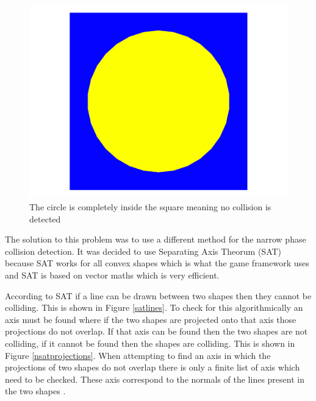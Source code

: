 \documentclass[]{report}
\begin{document}
			\begin{figure}[H]
				\centering
				\includegraphics[scale=0.25]{lineintersectionproblem}
				\caption{The circle is completely inside the square meaning no collision is detected}
				\label{lineintersectionproblem}
			\end{figure}
			
			The solution to this problem was to use a different method for the narrow phase collision detection. It was decided to use Separating Axis Theorum (SAT) \cite{sattutorial} because SAT works for all convex shapes which is what the game framework uses and SAT is based on vector maths which is very efficient. 
			
			According to SAT if a line can be drawn between two shapes then they cannot be colliding. This is shown in Figure \ref{satlines}. To check for this algorithmically an axis must be found where if the two shapes are projected onto that axis those projections do not overlap. If that axis can be found then the two shapes are not colliding, if it cannot be found then the shapes are colliding. This is shown in Figure \ref{nsatprojections}. When attempting to find an axis in which the projections of two shapes do not overlap there is only a finite list of axis which need to be checked. These axis correspond to the normals of the lines present in the two shapes \cite{sattutorial}.
			
\end{document}
